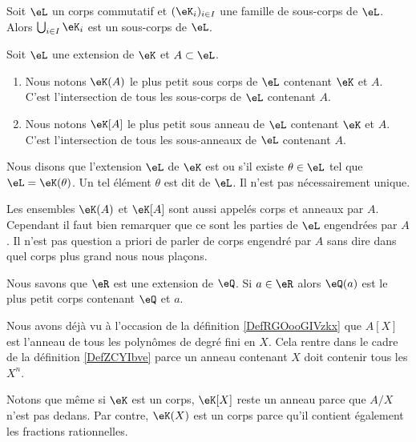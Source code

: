\begin{lemma}
    Soit \( \eL\) un corps commutatif et \( (\eK_i)_{i\in I}\) une famille de sous-corps de \( \eL\). Alors \( \bigcup_{i\in I}\eK_i\) est un sous-corps de \( \eL\).
\end{lemma}

\begin{definition}  \label{DefZCYIbve}
    Soit \( \eL\) une extension de \( \eK\) et \( A\subset \eL\). 
    \begin{enumerate}
        \item
            
    Nous notons \( \eK(A)\) le plus petit sous corps de \( \eL\) contenant \( \eK\) et \( A\). C'est l'intersection de tous les sous-corps de \( \eL\) contenant \( A\).
\item
    Nous notons \( \eK[A]\) le plus petit sous anneau de \( \eL\) contenant \( \eK\) et \( A\). C'est l'intersection de tous les sous-anneaux de \( \eL\) contenant \( A\).
    \end{enumerate}
    Nous disons que l'extension \( \eL\) de \( \eK\) est  ou  s'il existe \( \theta\in\eL\) tel que \( \eL=\eK(\theta)\). Un tel élément \( \theta\) est dit  de \( \eL\). Il n'est pas nécessairement unique.
\end{definition}

\begin{remark}
    Les ensembles \( \eK(A)\) et \( \eK[A]\) sont aussi appelés corps et anneaux  par \( A\). Cependant il faut bien remarquer que ce sont les parties de \( \eL\) engendrées par \( A\). Il n'est pas question a priori de parler de corps engendré par \( A\) sans dire dans quel corps plus grand nous nous plaçons.
\end{remark}

\begin{example}
    Nous savons que \( \eR\) est une extension de \( \eQ\). Si \( a\in \eR\) alors \( \eQ(a)\) est le plus petit corps contenant \( \eQ\) et \( a\).
\end{example}

\begin{example}
    Nous avons déjà vu à l'occasion de la définition \ref{DefRGOooGIVzkx} que \( A[X]\) est l'anneau de tous les polynômes de degré fini en \( X\). Cela rentre dans le cadre de la définition \ref{DefZCYIbve} parce un anneau contenant \( X\) doit contenir tous les \( X^n\).

    Notons que même si \( \eK\) est un corps, \( \eK[X]\) reste un anneau parce que \( A/X\) n'est pas dedans. Par contre, \( \eK(X)\) est un corps parce qu'il contient également les fractions rationnelles.
\end{example}

